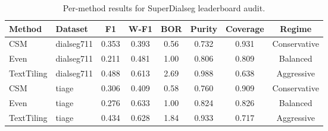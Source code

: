 \begin{table}[t]
\centering
\small
\begin{tabular}{llcccccc}
\toprule
Method & Dataset & F1 & W-F1 & BOR & Purity & Coverage & Regime \\
\midrule
CSM & dialseg711 & 0.353 & 0.393 & 0.56 & 0.732 & 0.931 & Conservative \\
Even & dialseg711 & 0.211 & 0.481 & 1.00 & 0.806 & 0.809 & Balanced \\
TextTiling & dialseg711 & 0.488 & 0.613 & 2.69 & 0.988 & 0.638 & Aggressive \\
CSM & tiage & 0.306 & 0.409 & 0.58 & 0.760 & 0.909 & Conservative \\
Even & tiage & 0.276 & 0.633 & 1.00 & 0.824 & 0.826 & Balanced \\
TextTiling & tiage & 0.434 & 0.628 & 1.84 & 0.933 & 0.717 & Aggressive \\
\bottomrule
\end{tabular}
\caption{Per-method results for SuperDialseg leaderboard audit.}
\label{tab:leaderboard-per-method}
\end{table}